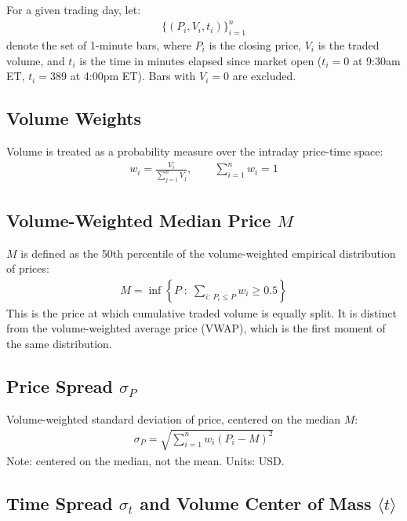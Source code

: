 \documentclass[preprint,12pt]{elsarticle}
\begin{document}
For a given trading day, let:
\begin{align}
    \{(P_i, V_i, t_i)\}_{i=1}^{n}
\end{align}
denote the set of 1-minute bars, where $P_i$ is the closing price, $V_i$ is the traded volume, and $t_i$ is the time in minutes elapsed since market open ($t_i = 0$ at 9:30am ET, $t_i = 389$ at 4:00pm ET). Bars with $V_i = 0$ are excluded.

\subsection{Volume Weights}

Volume is treated as a probability measure over the intraday price-time space:
\begin{align}
    w_i = \frac{V_i}{\sum_{j=1}^{n} V_j}, \qquad \sum_{i=1}^{n} w_i = 1
\end{align}

\subsection{Volume-Weighted Median Price \texorpdfstring{$M$}{M}}

$M$ is defined as the 50th percentile of the volume-weighted empirical distribution of prices:
\begin{align}
    M = \inf\left\{ P \;:\; \sum_{i:\, P_i \leq P} w_i \geq 0.5 \right\}
\end{align}
This is the price at which cumulative traded volume is equally split. It is distinct from the volume-weighted average price (VWAP), which is the first moment of the same distribution.

\subsection{Price Spread \texorpdfstring{$\sigma_P$}{sigma\_P}}

Volume-weighted standard deviation of price, centered on the median $M$:
\begin{align}
    \sigma_P = \sqrt{\sum_{i=1}^{n} w_i (P_i - M)^2}
\end{align}
Note: centered on the median, not the mean. Units: USD.

\subsection{Time Spread \texorpdfstring{$\sigma_t$}{sigma\_t} and Volume Center of Mass \texorpdfstring{$\langle t \rangle$}{<t>}}
\end{document}
